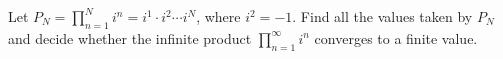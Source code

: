 Let $P_N=\displaystyle\prod_{n=1}^{N}i^n=i^1\cdot i^2\cdots i^N$, where $i^2=-1$. Find all the values taken by $P_N$ and decide whether the infinite product $\displaystyle\prod_{n=1}^{\infty}i^n$ converges to a finite value.
